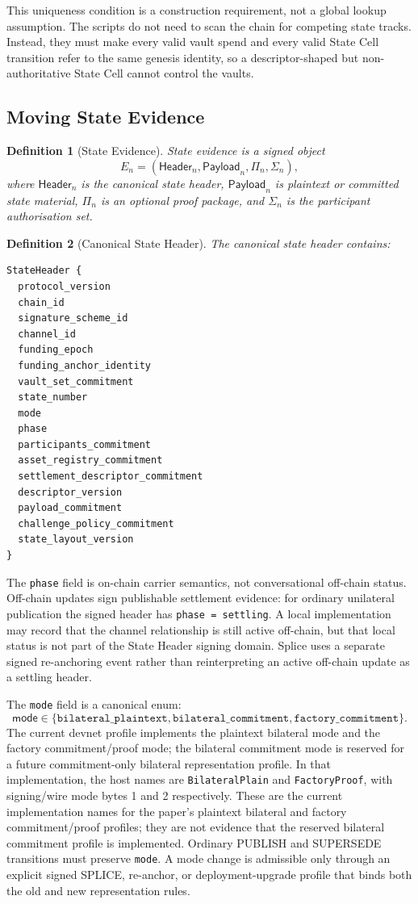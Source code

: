 \documentclass[a4paper,11pt]{article}
\newtheorem{definition}{Definition}
\newcommand{\Header}{\mathsf{Header}}
\newcommand{\Payload}{\mathsf{Payload}}
\begin{document}
This uniqueness condition is a construction requirement, not a global lookup assumption. The scripts do not need to scan the chain for competing state tracks. Instead, they must make every valid vault spend and every valid State Cell transition refer to the same genesis identity, so a descriptor-shaped but non-authoritative State Cell cannot control the vaults.

\subsection{Moving State Evidence}

\begin{definition}[State Evidence]
State evidence is a signed object
\[
E_n=(\Header_n,\Payload_n,\Pi_n,\Sigma_n),
\]
where $\Header_n$ is the canonical state header, $\Payload_n$ is plaintext or committed state material, $\Pi_n$ is an optional proof package, and $\Sigma_n$ is the participant authorisation set.
\end{definition}

\begin{definition}[Canonical State Header]
The canonical state header contains:
\begin{lstlisting}
StateHeader {
  protocol_version
  chain_id
  signature_scheme_id
  channel_id
  funding_epoch
  funding_anchor_identity
  vault_set_commitment
  state_number
  mode
  phase
  participants_commitment
  asset_registry_commitment
  settlement_descriptor_commitment
  descriptor_version
  payload_commitment
  challenge_policy_commitment
  state_layout_version
}
\end{lstlisting}
\end{definition}

The \texttt{phase} field is on-chain carrier semantics, not conversational
off-chain status. Off-chain updates sign publishable settlement evidence:
for ordinary unilateral publication the signed header has
\texttt{phase = settling}. A local implementation may record that the channel
relationship is still active off-chain, but that local status is not part of
the State Header signing domain. Splice uses a separate signed re-anchoring
event rather than reinterpreting an active off-chain update as a settling
header.

The \texttt{mode} field is a canonical enum:
\[
\mathsf{mode}\in\{
\texttt{bilateral\_plaintext},
\texttt{bilateral\_commitment},
\texttt{factory\_commitment}
\}.
\]
The current devnet profile implements the plaintext bilateral mode and the
factory commitment/proof mode; the bilateral commitment mode is reserved for a
future commitment-only bilateral representation profile.
In that implementation, the host names are \texttt{BilateralPlain} and
\texttt{FactoryProof}, with signing/wire mode bytes 1 and 2 respectively. These
are the current implementation names for the paper's plaintext bilateral and
factory commitment/proof profiles; they are not evidence that the reserved
bilateral commitment profile is implemented.
Ordinary \textsf{PUBLISH} and \textsf{SUPERSEDE} transitions must preserve
\texttt{mode}. A mode change is admissible only through an explicit signed
\textsf{SPLICE}, re-anchor, or deployment-upgrade profile that binds both the
old and new representation rules.
\end{document}
